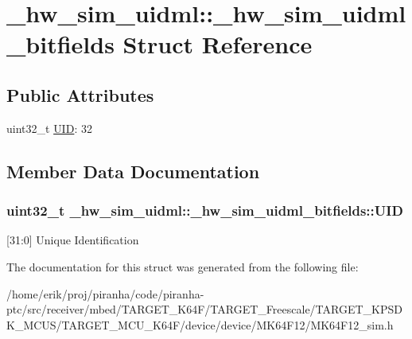 \hypertarget{struct__hw__sim__uidml_1_1__hw__sim__uidml__bitfields}{}\section{\+\_\+hw\+\_\+sim\+\_\+uidml\+:\+:\+\_\+hw\+\_\+sim\+\_\+uidml\+\_\+bitfields Struct Reference}
\label{struct__hw__sim__uidml_1_1__hw__sim__uidml__bitfields}
\subsection*{Public Attributes}
\begin{DoxyCompactItemize}
\item 
uint32\+\_\+t \hyperlink{struct__hw__sim__uidml_1_1__hw__sim__uidml__bitfields_aef2da2e82c0214d99361c954f2c91789}{U\+ID}\+: 32
\end{DoxyCompactItemize}


\subsection{Member Data Documentation}
\subsubsection[{\texorpdfstring{U\+ID}{UID}}]{\setlength{\rightskip}{0pt plus 5cm}uint32\+\_\+t \+\_\+hw\+\_\+sim\+\_\+uidml\+::\+\_\+hw\+\_\+sim\+\_\+uidml\+\_\+bitfields\+::\+U\+ID}\hypertarget{struct__hw__sim__uidml_1_1__hw__sim__uidml__bitfields_aef2da2e82c0214d99361c954f2c91789}{}\label{struct__hw__sim__uidml_1_1__hw__sim__uidml__bitfields_aef2da2e82c0214d99361c954f2c91789}
\mbox{[}31\+:0\mbox{]} Unique Identification 

The documentation for this struct was generated from the following file\+:\begin{DoxyCompactItemize}
\item 
/home/erik/proj/piranha/code/piranha-\/ptc/src/receiver/mbed/\+T\+A\+R\+G\+E\+T\+\_\+\+K64\+F/\+T\+A\+R\+G\+E\+T\+\_\+\+Freescale/\+T\+A\+R\+G\+E\+T\+\_\+\+K\+P\+S\+D\+K\+\_\+\+M\+C\+U\+S/\+T\+A\+R\+G\+E\+T\+\_\+\+M\+C\+U\+\_\+\+K64\+F/device/device/\+M\+K64\+F12/M\+K64\+F12\+\_\+sim.\+h\end{DoxyCompactItemize}
